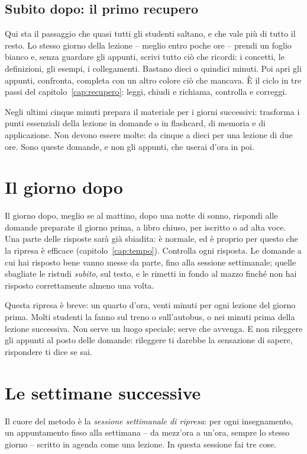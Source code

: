 \subsection*{Subito dopo: il primo recupero}

Qui sta il passaggio che quasi tutti gli studenti saltano, e che vale
più di tutto il resto. Lo stesso giorno della lezione -- meglio entro
poche ore -- prendi un foglio bianco e, senza guardare gli appunti,
scrivi tutto ciò che ricordi: i concetti, le definizioni, gli esempi, i
collegamenti. Bastano dieci o quindici minuti. Poi apri gli appunti,
confronta, completa con un altro colore ciò che mancava. È il ciclo in
tre passi del capitolo~\ref{cap:recupero}: leggi, chiudi e richiama,
controlla e correggi.

Negli ultimi cinque minuti prepara il materiale per i giorni
successivi: trasforma i punti essenziali della lezione in domande o in
flashcard, di memoria e di applicazione. Non devono essere molte: da
cinque a dieci per una lezione di due ore. Sono queste domande, e non
gli appunti, che userai d'ora in poi.

\section{Il giorno dopo}

Il giorno dopo, meglio se al mattino, dopo una notte di sonno, rispondi
alle domande preparate il giorno prima, a libro chiuso, per iscritto o
ad alta voce. Una parte delle risposte sarà già sbiadita: è normale,
ed è proprio per questo che la ripresa è efficace
(capitolo~\ref{cap:tempo}). Controlla ogni risposta. Le domande a cui
hai risposto bene vanno messe da parte, fino alla sessione settimanale;
quelle sbagliate le ristudi \emph{subito}, sul testo, e le rimetti in
fondo al mazzo finché non hai risposto correttamente almeno una volta.

Questa ripresa è breve: un quarto d'ora, venti minuti per ogni lezione
del giorno prima. Molti studenti la fanno sul treno o sull'autobus, o
nei minuti prima della lezione successiva. Non serve un luogo speciale;
serve che avvenga. E non rileggere gli appunti al posto delle domande:
rileggere ti darebbe la sensazione di sapere, rispondere ti dice se
sai.

\section{Le settimane successive}

Il cuore del metodo è la \emph{sessione settimanale di ripresa}: per
ogni insegnamento, un appuntamento fisso alla settimana -- da mezz'ora
a un'ora, sempre lo stesso giorno -- scritto in agenda come una
lezione. In questa sessione fai tre cose.

